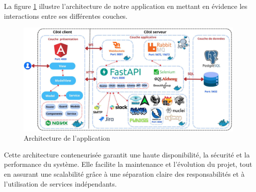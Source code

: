 La figure \ref{fig:architecture} illustre l’architecture de notre application en mettant en évidence les interactions entre ses différentes couches.
\begin{figure}[H]
    \centering
    \includegraphics[width=\linewidth]{chapitres/ch2/img/architecture.png}
    \caption{Architecture de l’application}
    \label{fig:architecture}
\end{figure}
\vspace{-0.8cm}
\noindent Cette architecture conteneurisée garantit une haute disponibilité, la sécurité et la performance du système. Elle facilite la maintenance et l’évolution du projet, tout en assurant une scalabilité grâce à une séparation claire des responsabilités et à l’utilisation de services indépendants.